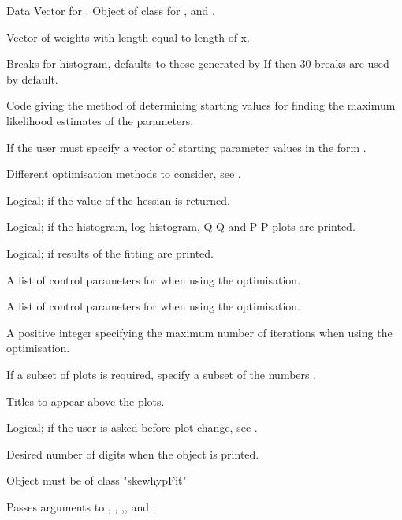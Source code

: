 \begin{Arguments}
\begin{ldescription}
\item[\code{x}] Data Vector for . Object of class
 for ,
 and .
\item[\code{freq}] Vector of weights with length equal to length of x.
\item[\code{breaks}] Breaks for histogram, defaults to those generated by
If 
then 30 breaks are used by default.
\item[\code{startValues}] Code giving the method of determining starting
values for finding the maximum likelihood estimates of the
parameters.
\item[\code{paramStart}] If  the user must specify a
vector of starting parameter values in the form .
\item[\code{method}] Different optimisation methods to consider, see
.
\item[\code{hessian}] Logical; if  the value of the
hessian is returned.
\item[\code{plots}] Logical; if  the histogram,
log-histogram, Q-Q and P-P plots are printed.
\item[\code{printOut}] Logical; if  results of the
fitting are printed.
\item[\code{controlBFGS}] A list of control parameters for  when
using the  optimisation.
\item[\code{controlNM}] A list of control parameters for 
when using the  optimisation.
\item[\code{maxitNLM}] A positive integer specifying the maximum number of
iterations when using the  optimisation.
\item[\code{which}] If a subset of plots is required, specify a subset of the
numbers .
\item[\code{plotTitles}] Titles to appear above the plots.
\item[\code{ask}] Logical; if  the user is asked before plot
change, see .
\item[\code{digits}] Desired number of digits when the object is printed.
\item[\code{object}] Object must be of class "skewhypFit"
\item[\code{...}] Passes arguments to , ,
,,
 and .
\end{ldescription}
\end{Arguments}
